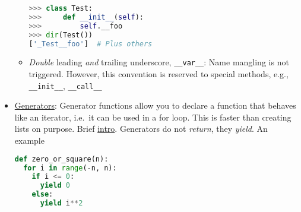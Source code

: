 \documentclass[a4paper,12pt,%
              final%
              ]{article}
\begin{document}
\begin{itemize}
\begin{itemize}
\begin{lstlisting}[language=python]
>>> class Test:
>>>     def __init__(self):
>>>         self.__foo
>>> dir(Test())
['_Test__foo']  # Plus others
\end{lstlisting}
      \item \emph{Double} leading \emph{and} trailing underscore, \verb|__var__|: Name mangling is not triggered. However, this convention is reserved to special methods, e.g., \verb|__init__|, \verb|__call__|
    \end{itemize}
  \item \href{https://wiki.python.org/moin/Generators}{Generators}: Generator functions allow you to declare a function that behaves like an iterator, i.e.\ it can be used in a for loop. This is faster than creating lists on purpose. Brief \href{https://www.programiz.com/python-programming/generator}{intro}. Generators do not \emph{return}, they \emph{yield}. An example
\begin{lstlisting}[language=python]
def zero_or_square(n):
  for i in range(-n, n):
    if i <= 0:
      yield 0
    else:
      yield i**2


\end{lstlisting}
\end{itemize}
\end{document}
